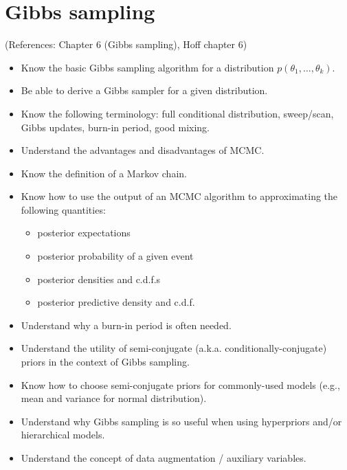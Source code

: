 \documentclass[12pt]{article}
\begin{document}
\section{Gibbs sampling}
(References: Chapter 6 (Gibbs sampling), Hoff chapter 6)
\begin{itemize}
\setlength\itemsep{0em}
\item Know the basic Gibbs sampling algorithm for a distribution $p(\theta_1,\ldots,\theta_k)$.
\item Be able to derive a Gibbs sampler for a given distribution.
\item Know the following terminology: full conditional distribution, sweep/scan, Gibbs updates, burn-in period, good mixing.
\item Understand the advantages and disadvantages of MCMC.
\item Know the definition of a Markov chain.
\item Know how to use the output of an MCMC algorithm to approximating the following quantities:
\begin{itemize}
\setlength\itemsep{0em}
    \item posterior expectations
    \item posterior probability of a given event
    \item posterior densities and c.d.f.s
    \item posterior predictive density and c.d.f.
\end{itemize}
\item Understand why a burn-in period is often needed.
\item Understand the utility of semi-conjugate (a.k.a. conditionally-conjugate) priors in the context of Gibbs sampling.
\item Know how to choose semi-conjugate priors for commonly-used models (e.g., mean and variance for normal distribution).
\item Understand why Gibbs sampling is so useful when using hyperpriors and/or hierarchical models.
\item Understand the concept of data augmentation / auxiliary variables.
\end{itemize}
\end{document}
